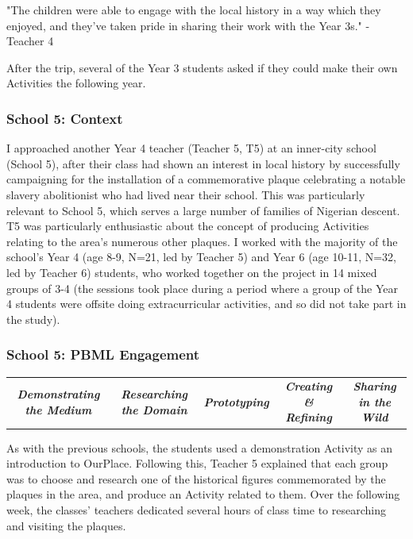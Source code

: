 \begin{displayquote}
"The children were able to engage with the local history in a way which they enjoyed, and they've taken pride in sharing their work with the Year 3s." - Teacher 4
\end{displayquote}

After the trip, several of the Year 3 students asked if they could make their own Activities the following year.

\subsubsection{School 5: Context}

I approached another Year 4 teacher (Teacher 5, T5) at an inner-city school (School 5), after their class had shown an interest in local history by successfully campaigning for the installation of a commemorative plaque celebrating a notable slavery abolitionist who had lived near their school. This was particularly relevant to School 5, which serves a large number of families of Nigerian descent. T5 was particularly enthusiastic about the concept of producing Activities relating to the area's numerous other plaques. I worked with the majority of the school's Year 4 (age 8-9, N=21, led by Teacher 5) and Year 6 (age 10-11, N=32, led by Teacher 6) students, who worked together on the project in 14 mixed groups of 3-4 (the sessions took place during a period where a group of the Year 4 students were offsite doing extracurricular activities, and so did not take part in the study). 

\subsubsection{School 5: PBML Engagement}

\begin{table}[h]
    \centering
    \begin{tabulary}{\textwidth}{C|C|p{19mm}|C|C}
    \small\textit{\textbf{Demonstrating the Medium}} 
    & \small\textit{\textbf{Researching the Domain}}
    & \small\textit{\textbf{Prototyping}}
    & \small\textit{\textbf{Creating \& Refining}}
    & \small\textit{\textbf{Sharing in the Wild}}\\
\end{tabulary}
\end{table}

As with the previous schools, the students used a demonstration Activity as an introduction to OurPlace. Following this, Teacher 5 explained that each group was to choose and research one of the historical figures commemorated by the plaques in the area, and produce an Activity related to them. Over the following week, the classes' teachers dedicated several hours of class time to researching and visiting the plaques.

